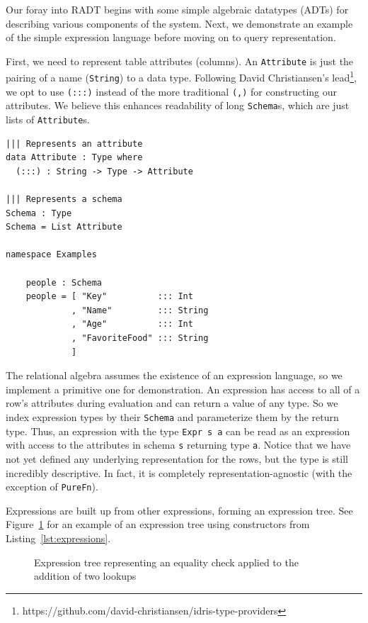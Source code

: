 \documentclass[12pt]{report}
\begin{document}
Our foray into RADT begins with some simple algebraic datatypes (ADTs) for describing various components of the system.
Next, we demonstrate an example of the simple expression language before moving on to query representation.

First, we need to represent table attributes (columns).
An \texttt{Attribute} is just the pairing of a name (\texttt{String}) to a data type.
Following David Christiansen's lead\footnote{https://github.com/david-christiansen/idris-type-providers}, we opt to use \texttt{(:::)} instead of the more traditional \texttt{(,)} for constructing our attributes\cite{ChristiansenTypeProviders}.
We believe this enhances readability of long \texttt{Schema}s, which are just lists of \texttt{Attribute}s.

\begin{lstlisting}[caption={Representing attributes and schemas},label={lst:attrs_and_schemas}]
||| Represents an attribute
data Attribute : Type where
  (:::) : String -> Type -> Attribute

||| Represents a schema
Schema : Type
Schema = List Attribute

namespace Examples

    people : Schema
    people = [ "Key"          ::: Int
             , "Name"         ::: String
             , "Age"          ::: Int
             , "FavoriteFood" ::: String
             ]
\end{lstlisting}

The relational algebra assumes the existence of an expression language, so we implement a primitive one for demonstration.
An expression has access to all of a row's attributes during evaluation and can return a value of any type.
So we index expression types by their \texttt{Schema} and parameterize them by the return type.
Thus, an expression with the type \texttt{Expr s a} can be read as an expression with access to the attributes in schema \texttt{s} returning type \texttt{a}.
Notice that we have not yet defined any underlying representation for the rows, but the type is still incredibly descriptive.
In fact, it is completely representation-agnostic (with the exception of \texttt{PureFn}).

Expressions are built up from other expressions, forming an expression tree.
See Figure~\ref{fig:expr_tree} for an example of an expression tree using constructors from Listing~\ref{lst:expressions}.

\begin{figure}
     \centering
     \def\svgwidth{0.75\linewidth}
     
     \caption{Expression tree representing an equality check applied to the addition of two lookups}
     \label{fig:expr_tree}
\end{figure}
\end{document}
